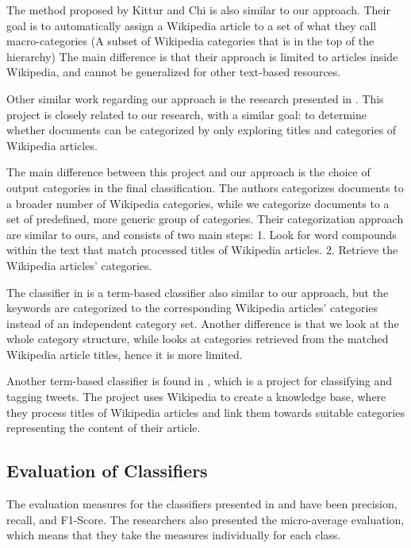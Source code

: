 The method proposed by Kittur and Chi \cite{kittur2009s} is also similar to our approach. 
Their goal is to automatically assign a Wikipedia article to a set of what they call macro-categories (A subset of Wikipedia categories that is in the top of the hierarchy) 
The main difference is that their approach is limited to articles inside Wikipedia, and cannot be generalized for other text-based resources. 


Other similar work regarding our approach is the research presented in  \cite{schonhofen2009identifying} . This project is closely related to our research, with a similar goal: to determine whether documents can be categorized by only exploring titles and categories of Wikipedia articles.

The main difference between this project and our approach is the choice of output categories in the final classification. The authors categorizes documents to a broader number of Wikipedia categories, while we categorize documents to a set of predefined, more generic group of categories. Their categorization approach are similar to ours, and consists of two main steps:
1. Look for word compounds within the text that match processed titles of Wikipedia articles.
2. Retrieve the Wikipedia articles’ categories.

The classifier in \cite{schonhofen2009identifying} is a term-based classifier also similar to our approach, but the keywords are categorized to the corresponding Wikipedia articles’ categories instead of an independent category set. Another difference is that we look at the whole category structure, while \cite{schonhofen2009identifying} looks at categories retrieved from the matched Wikipedia article titles, hence it is more limited. 

Another term-based classifier is found in \cite{Gabrilovich:2006}, which is a project for classifying and tagging tweets. The project uses Wikipedia to create a knowledge base, where they process titles of Wikipedia articles and link them towards suitable categories representing the content of their article.



\subsection{\hspace*{3pt} Evaluation of Classifiers}

The evaluation measures for the classifiers presented in \cite{schonhofen2009identifying} and  \cite{Gabrilovich:2006} have been precision, recall, and F1-Score. The researchers also presented the micro-average evaluation, which means that they take the measures individually for each class.


